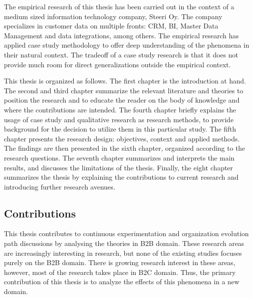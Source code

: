 \documentclass[english]{tktltiki2}
\theoremstyle{definition}
\theoremstyle{remark}
\begin{document}
The empirical research of this thesis has been carried out in the context of a medium sized information technology company, Steeri Oy. The company specializes in customer data on multiple fronts: CRM, BI, Master Data Management and data integrations, among others. The empirical research has applied case study methodology to offer deep understanding of the phenomena in their natural context. The tradeoff of a case study research is that it does not provide much room for direct generalizations outside the empirical context. 

This thesis is organized as follows. The first chapter is the introduction at hand. The second and third chapter summarize the relevant literature and theories to position the research and to educate the reader on the body of knowledge and where the contributions are intended. The fourth chapter briefly explains the usage of case study and qualitative research as research methods, to provide background for the decision to utilize them in this particular study. The fifth chapter presents the research design: objectives, context and applied methods. The findings are then presented in the sixth chapter, organized according to the research questions. The seventh chapter summarizes and interprets the main results, and discusses the limitations of the thesis. Finally, the eight chapter summarizes the thesis by explaining the contributions to current research and introducing further research avenues.
%

\subsection{Contributions}

This thesis contributes to continuous experimentation \cite{fagerholm2014building} and organization evolution path \cite{olsson2012climbing} discussions by analysing the theories in B2B domain. These research areas are increasingly interesting in research, but none of the existing studies focuses purely on the B2B domain. There is growing research interest in these areas, however, most of the research takes place in B2C domain. Thus, the primary contribution of this thesis is to analyze the effects of this phenomena in a new domain. 
\end{document}

